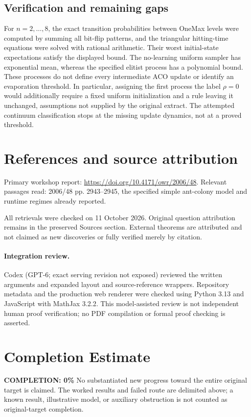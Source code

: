 \documentclass[11pt]{article}
\begin{document}
\subsection{Verification and remaining gaps}
For $n=2,\ldots,8$, the exact transition probabilities between OneMax levels were computed by summing all bit-flip patterns, and the triangular hitting-time equations were solved with rational arithmetic. Their worst initial-state expectations satisfy the displayed bound. The no-learning uniform sampler has exponential mean, whereas the specified elitist process has a polynomial bound. These processes do not define every intermediate ACO update or identify an evaporation threshold. In particular, assigning the first process the label $\rho=0$ would additionally require a fixed uniform initialization and a rule leaving it unchanged, assumptions not supplied by the original extract. The attempted continuum classification stops at the missing update dynamics, not at a proved threshold.

\section{References and source attribution}
Primary workshop report: \url{https://doi.org/10.4171/owr/2006/48}. Relevant passages read: 2006/48 pp. 2943--2945, the specified simple ant-colony model and runtime regimes already reported.

All retrievals were checked on 11 October 2026. Original question attribution remains in the preserved Sources section. External theorems are attributed and not claimed as new discoveries or fully verified merely by citation.


\paragraph{Integration review.} Codex (GPT-6; exact serving revision not exposed) reviewed the written arguments and expanded layout and source-reference wrappers. Repository metadata and the production web renderer were checked using Python 3.13 and JavaScript with MathJax 3.2.2. This model-assisted review is not independent human proof verification; no PDF compilation or formal proof checking is asserted.

\section{Completion Estimate}
\noindent\textbf{COMPLETION: 0\%}
No substantiated new progress toward the entire original target is claimed. The worked results and failed route are delimited above; a known result, illustrative model, or auxiliary obstruction is not counted as original-target completion.
\end{document}
